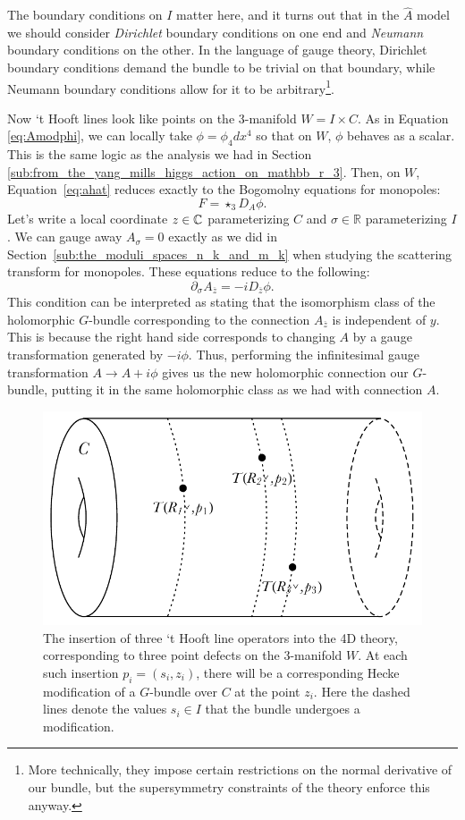 	The boundary conditions on $I$ matter here, and it turns out that in the $\hat A$ model we should consider \emph{Dirichlet} boundary conditions on one end and \emph{Neumann} boundary conditions on the other. In the language of gauge theory, Dirichlet boundary conditions demand the bundle to be trivial on that boundary, while Neumann boundary conditions allow for it to be arbitrary\footnote{More technically, they impose certain restrictions on the normal derivative of our bundle, but the supersymmetry constraints of the theory enforce this anyway.}.
	
	Now `t Hooft lines look like points on the 3-manifold $W = I \times C$. As in Equation \ref{eq:Amodphi}, we can locally take $\phi = \phi_4 dx^4$ so that on $W$, $\phi$ behaves as a scalar. This is the same logic as the analysis we had in Section \ref{sub:from_the_yang_mills_higgs_action_on_mathbb_r_3}.
	Then, on $W$, Equation~\eqref{eq:ahat} reduces exactly to the Bogomolny equations for monopoles:
	\[
		F = \star_3 D_A \phi.
	\]
	Let's write a local coordinate $z \in \mathbb{C}$ parameterizing $C$ and $\sigma \in \mathbb R$ parameterizing $I$.
	We can gauge away $A_\sigma = 0$ exactly as we did in Section~\ref{sub:the_moduli_spaces_n_k_and_m_k} when studying the scattering transform for monopoles. These equations reduce to the following:
	\[
		\partial_\sigma A_{\overline z} = - i D_{\overline z} \phi.
	\]
	This condition can be interpreted as stating that the isomorphism class of the holomorphic $G$-bundle corresponding to the connection $A_{\overline z}$ is independent of $y$. This is because the right hand side corresponds to changing $A$ by a gauge transformation generated by $-i \phi$. Thus, performing the infinitesimal gauge transformation $A \to A + i \phi$ gives us the new holomorphic connection our $G$-bundle, putting it in the same holomorphic class as we had with connection $A$.
	
 \begin{figure}
 	\centering
	\includegraphics[scale=0.8]{Figures/Hooft}
	\caption{The insertion of three `t Hooft line operators into the 4D theory, corresponding to three point defects on the 3-manifold $W$. At each such insertion $p_i = (s_i, z_i)$, there will be a corresponding Hecke modification of a $G$-bundle over $C$ at the point $z_i$. Here the dashed lines denote the values $s_i \in I$ that the bundle undergoes a modification.}
	\label{fig:hooft1}
 \end{figure}
	

